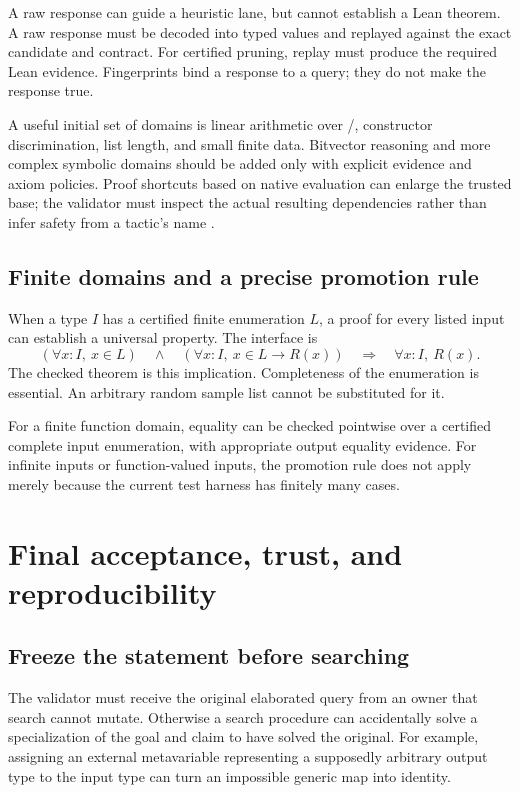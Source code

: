 \documentclass[11pt,a4paper]{article}
\newcommand{\code}[1]{\texttt{\detokenize{#1}}}
\theoremstyle{remark}
\begin{document}
A raw \code{unsat} response can guide a heuristic lane, but cannot establish a Lean theorem. A raw \code{sat} response must be decoded into typed values and replayed against the exact candidate and contract. For certified pruning, replay must produce the required Lean evidence. Fingerprints bind a response to a query; they do not make the response true.

A useful initial set of domains is linear arithmetic over \code{Nat}/\code{Int}, constructor discrimination, list length, and small finite data. Bitvector reasoning and more complex symbolic domains should be added only with explicit evidence and axiom policies. Proof shortcuts based on native evaluation can enlarge the trusted base; the validator must inspect the actual resulting dependencies rather than infer safety from a tactic's name \cite{lean-validation}.

\subsection{Finite domains and a precise promotion rule}

When a type $I$ has a certified finite enumeration $L$, a proof for every listed input can establish a universal property. The interface is
\[
 (\forall x:I,\ x\in L)\quad\land\quad
 (\forall x:I,\ x\in L\to R(x))
 \quad\Longrightarrow\quad \forall x:I,\ R(x).
\]
The checked theorem \code{finiteValidation} is this implication. Completeness of the enumeration is essential. An arbitrary random sample list cannot be substituted for it.

For a finite function domain, equality can be checked pointwise over a certified complete input enumeration, with appropriate output equality evidence. For infinite inputs or function-valued inputs, the promotion rule does not apply merely because the current test harness has finitely many cases.

\section{Final acceptance, trust, and reproducibility}\label{sec:validation}

\subsection{Freeze the statement before searching}

The validator must receive the original elaborated query from an owner that search cannot mutate. Otherwise a search procedure can accidentally solve a specialization of the goal and claim to have solved the original. For example, assigning an external metavariable representing a supposedly arbitrary output type to the input type can turn an impossible generic map into identity.
\end{document}
